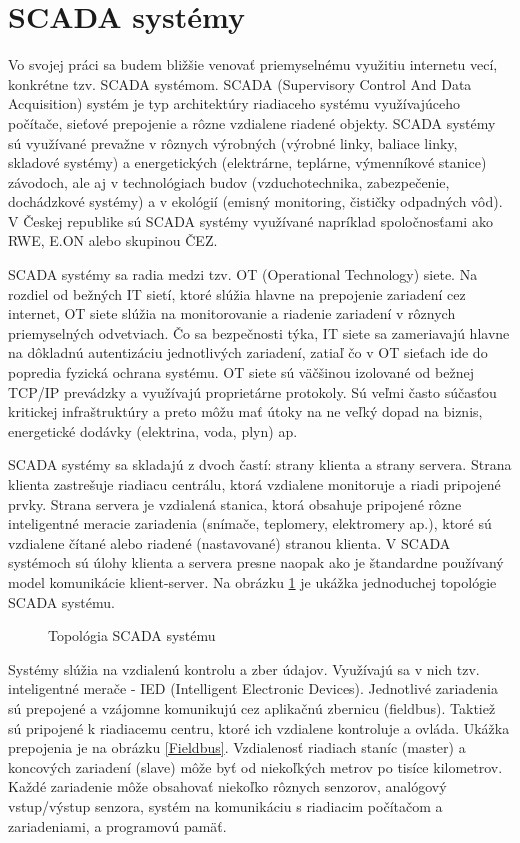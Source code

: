 \section{SCADA systémy}
\tab Vo svojej práci sa budem bližšie venovať priemyselnému využitiu internetu vecí, konkrétne tzv. SCADA systémom. SCADA (Supervisory Control And Data Acquisition) systém je typ architektúry riadiaceho systému využívajúceho počítače, sieťové prepojenie a rôzne vzdialene riadené objekty. SCADA systémy sú využívané prevažne v rôznych výrobných (výrobné linky, baliace linky, skladové systémy) a energetických (elektrárne, teplárne, výmenníkové stanice) závodoch, ale aj v technológiach budov (vzduchotechnika, zabezpečenie, dochádzkové systémy) a v ekológií (emisný monitoring, čističky odpadných vôd). V Českej republike sú SCADA systémy využívané napríklad spoločnosťami ako RWE, E.ON alebo skupinou ČEZ. \par 
SCADA systémy sa radia medzi tzv. OT (Operational Technology) siete. Na rozdiel od bežných IT sietí, ktoré slúžia hlavne na prepojenie zariadení cez internet, OT siete slúžia na monitorovanie a riadenie zariadení v rôznych priemyselných odvetviach. Čo sa bezpečnosti týka, IT siete sa zameriavajú hlavne na dôkladnú autentizáciu jednotlivých zariadení, zatiaľ čo v OT sieťach ide do popredia fyzická ochrana systému. OT siete sú väčšinou izolované od bežnej TCP/IP prevádzky a využívajú proprietárne protokoly. Sú veľmi často súčasťou kritickej infraštruktúry a preto môžu mať útoky na ne veľký dopad na biznis, energetické dodávky (elektrina, voda, plyn) ap. \par
SCADA systémy sa skladajú z dvoch častí: strany klienta a strany servera. Strana klienta zastrešuje riadiacu centrálu, ktorá vzdialene monitoruje a riadi pripojené prvky. Strana servera je vzdialená stanica, ktorá obsahuje pripojené rôzne inteligentné meracie zariadenia (snímače, teplomery, elektromery ap.), ktoré sú vzdialene čítané alebo riadené (nastavované) stranou klienta. V SCADA systémoch sú úlohy klienta a servera presne naopak ako je štandardne používaný model komunikácie klient-server. Na obrázku \ref{scada} je ukážka jednoduchej topológie SCADA systému. \par
\begin{figure}[h]
    \centering
    \caption{Topológia SCADA systému}
\label{scada}
\end{figure}
Systémy slúžia na vzdialenú kontrolu a zber údajov. Využívajú sa v nich tzv. inteligentné merače - IED (Intelligent Electronic Devices). Jednotlivé zariadenia sú prepojené a vzájomne komunikujú cez aplikačnú zbernicu (fieldbus). Taktiež sú pripojené k riadiacemu centru, ktoré ich vzdialene kontroluje a ovláda. Ukážka prepojenia je na obrázku \ref{Fieldbus}. Vzdialenosť riadiach staníc (master) a koncových zariadení (slave) môže byť od niekoľkých metrov po tisíce kilometrov. Každé zariadenie môže obsahovať niekoľko rôznych senzorov, analógový vstup/výstup senzora, systém na komunikáciu s riadiacim počítačom a zariadeniami, a programovú pamäť\cite{SCADA}. \par
